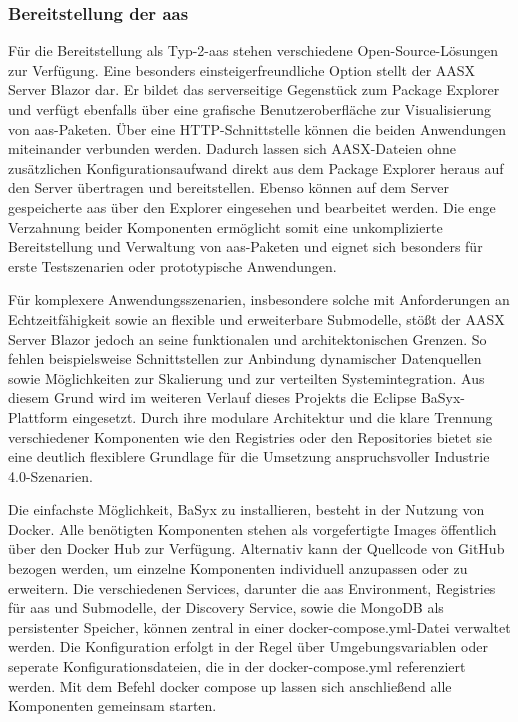 \subsubsection{Bereitstellung der \acs{aas}}
\label{sec:bereitstellungAAS}
Für die Bereitstellung als Typ-2-\acs{aas} stehen verschiedene Open-Source-Lösungen zur Verfügung. 
Eine besonders einsteigerfreundliche Option stellt der AASX Server Blazor \cite{AASXServer} dar.
Er bildet das serverseitige Gegenstück zum Package Explorer und verfügt ebenfalls über eine grafische Benutzeroberfläche zur Visualisierung von \acs{aas}-Paketen.
Über eine HTTP-Schnittstelle können die beiden Anwendungen miteinander verbunden werden.
Dadurch lassen sich AASX-Dateien ohne zusätzlichen Konfigurationsaufwand direkt aus dem Package Explorer heraus auf den Server übertragen und bereitstellen.
Ebenso können auf dem Server gespeicherte \acs{aas} über den Explorer eingesehen und bearbeitet werden.
Die enge Verzahnung beider Komponenten ermöglicht somit eine unkomplizierte Bereitstellung und Verwaltung von \acs{aas}-Paketen und eignet sich besonders für erste Testszenarien oder prototypische Anwendungen.

Für komplexere Anwendungsszenarien, insbesondere solche mit Anforderungen an Echtzeitfähigkeit sowie an flexible und erweiterbare Submodelle, stößt der AASX Server Blazor jedoch an seine funktionalen und architektonischen Grenzen. 
So fehlen beispielsweise Schnittstellen zur Anbindung dynamischer Datenquellen sowie Möglichkeiten zur Skalierung und zur verteilten Systemintegration.
Aus diesem Grund wird im weiteren Verlauf dieses Projekts die Eclipse BaSyx-Plattform eingesetzt.
Durch ihre modulare Architektur und die klare Trennung verschiedener Komponenten wie den Registries oder den Repositories bietet sie eine deutlich flexiblere Grundlage für die Umsetzung anspruchsvoller Industrie 4.0-Szenarien.

Die einfachste Möglichkeit, BaSyx zu installieren, besteht in der Nutzung von Docker.
Alle benötigten Komponenten stehen als vorgefertigte Images öffentlich über den Docker Hub zur Verfügung. 
Alternativ kann der Quellcode von GitHub bezogen werden, um einzelne Komponenten individuell anzupassen oder zu erweitern.
Die verschiedenen Services, darunter die \acs{aas} Environment, Registries für \acs{aas} und Submodelle, der Discovery Service, sowie die MongoDB als persistenter Speicher, können zentral in einer docker-compose.yml-Datei verwaltet werden.
Die Konfiguration erfolgt in der Regel über Umgebungsvariablen oder seperate Konfigurationsdateien, die in der docker-compose.yml referenziert werden.
Mit dem Befehl docker compose up lassen sich anschließend alle Komponenten gemeinsam starten.

